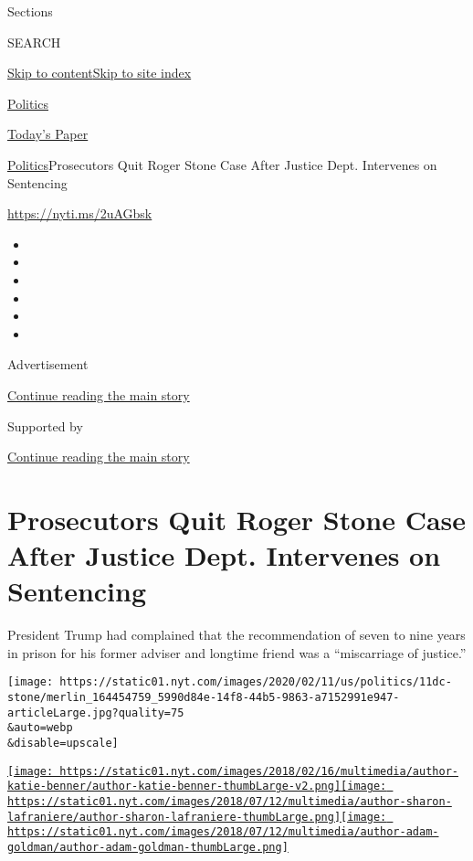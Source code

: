 Sections

SEARCH

\protect\hyperlink{site-content}{Skip to
content}\protect\hyperlink{site-index}{Skip to site index}

\href{https://www.nytimes.com/section/politics}{Politics}

\href{https://myaccount.nytimes.com/auth/login?response_type=cookie\&client_id=vi}{}

\href{https://www.nytimes.com/section/todayspaper}{Today's Paper}

\href{/section/politics}{Politics}\textbar{}Prosecutors Quit Roger Stone
Case After Justice Dept. Intervenes on Sentencing

\url{https://nyti.ms/2uAGbsk}

\begin{itemize}
\item
\item
\item
\item
\item
\item
\end{itemize}

Advertisement

\protect\hyperlink{after-top}{Continue reading the main story}

Supported by

\protect\hyperlink{after-sponsor}{Continue reading the main story}

\hypertarget{prosecutors-quit-roger-stone-case-after-justice-dept-intervenes-on-sentencing}{%
\section{Prosecutors Quit Roger Stone Case After Justice Dept.
Intervenes on
Sentencing}\label{prosecutors-quit-roger-stone-case-after-justice-dept-intervenes-on-sentencing}}

President Trump had complained that the recommendation of seven to nine
years in prison for his former adviser and longtime friend was a
``miscarriage of justice.''

\texttt{[image: https://static01.nyt.com/images/2020/02/11/us/politics/11dc-stone/merlin\_164454759\_5990d84e-14f8-44b5-9863-a7152991e947-articleLarge.jpg?quality=75\\\&auto=webp\\\&disable=upscale]}

\href{https://www.nytimes.com/by/katie-benner}{\texttt{[image: https://static01.nyt.com/images/2018/02/16/multimedia/author-katie-benner/author-katie-benner-thumbLarge-v2.png]}}\href{https://www.nytimes.com/by/sharon-lafraniere}{\texttt{[image: https://static01.nyt.com/images/2018/07/12/multimedia/author-sharon-lafraniere/author-sharon-lafraniere-thumbLarge.png]}}\href{https://www.nytimes.com/by/adam-goldman}{\texttt{[image: https://static01.nyt.com/images/2018/07/12/multimedia/author-adam-goldman/author-adam-goldman-thumbLarge.png]}}

